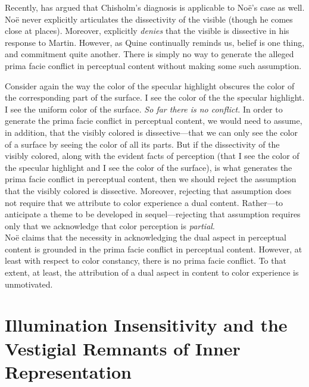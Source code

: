 \documentclass[12pt]{article}
\begin{document}
Recently, \citet{Martin:2008kl} has argued that Chisholm's diagnosis is applicable to Noë's case as well. Noë never explicitly articulates the dissectivity of the visible (though he comes close at places). Moreover, \citet[698-699]{Noe:2008oq} explicitly \emph{denies} that the visible is dissective in his response to Martin. However, as Quine continually reminds us, belief is one thing, and commitment quite another. There is simply no way to generate the alleged prima facie conflict in perceptual content without making some such assumption.


Consider again the way the color of the specular highlight obscures the color of the corresponding part of the surface. I see the color of the the specular highlight. I see the uniform color of the surface. \emph{So far there is no conflict.} In order to generate the prima facie conflict in perceptual content, we would need to assume, in addition, that the visibly colored is dissective---that we can only see the color of a surface by seeing the color of all its parts. But if the dissectivity of the visibly colored, along with the evident facts of perception (that I see the color of the specular highlight and I see the color of the surface), is what generates the prima facie conflict in perceptual content, then we should reject the assumption that the visibly colored is dissective. Moreover, rejecting that assumption does not require that we attribute to color experience a dual content. Rather---to anticipate a theme to be developed in sequel---rejecting that assumption requires only that we acknowledge that color perception is \emph{partial}.\\


\noindent Noë claims that the necessity in acknowledging the dual aspect in perceptual content is grounded in the prima facie conflict in perceptual content. However, at least with respect to color constancy, there is no prima facie conflict. To that extent, at least, the attribution of a dual aspect in content to color experience is unmotivated.


\section{Illumination Insensitivity and the Vestigial Remnants of Inner Representation} %
\label{sec:vestigal_remnants_of_inner_representations}
\end{document}
